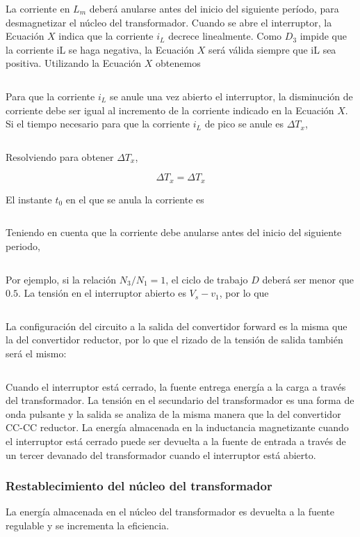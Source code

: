 $$  $$

La corriente en $L_m$ deberá anularse antes del inicio del siguiente período, para desmagnetizar
el núcleo del transformador. Cuando se abre el interruptor, la Ecuación $X$ indica que la corriente
$i_L$ decrece linealmente. Como $D_3$ impide que la corriente iL se haga negativa, la Ecuación
$X$ será válida siempre que iL sea positiva. Utilizando la Ecuación $X$ obtenemos

$$  $$

Para que la corriente $i_L$ se anule una vez abierto el interruptor, la disminución de corriente
debe ser igual al incremento de la corriente indicado en la Ecuación $X$. Si el tiempo necesario
para que la corriente $i_L$ de pico se anule es $\Delta T_x$, 

$$  $$

Resolviendo para obtener $\Delta T_x$,

$$ \Delta T_x=\Delta T_x $$

El instante $t_0$ en el que se anula la corriente es

$$  $$

Teniendo en cuenta que la corriente debe anularse antes del inicio del siguiente periodo,

$$  $$

Por ejemplo, si la relación $N_3/N_1 = 1$, el ciclo de trabajo $D$ deberá ser menor que $0.5$. La tensión
en el interruptor abierto es $V_s-v_1$, por lo que

$$  $$

La configuración del circuito a la salida del convertidor forward es la misma que la del convertidor
reductor, por lo que el rizado de la tensión de salida también será el mismo:

$$  $$

Cuando el interruptor está cerrado, la fuente entrega energía a la carga a través del transformador.
La tensión en el secundario del transformador es una forma de onda pulsante y la salida se
analiza de la misma manera que la del convertidor CC-CC reductor. La energía almacenada en
la inductancia magnetizante cuando el interruptor está cerrado puede ser devuelta a la fuente de
entrada a través de un tercer devanado del transformador cuando el interruptor está abierto.

\subsubsection{Restablecimiento del núcleo del transformador}
La energía almacenada en el núcleo del transformador es devuelta a la fuente regulable y se incrementa la eficiencia. 

